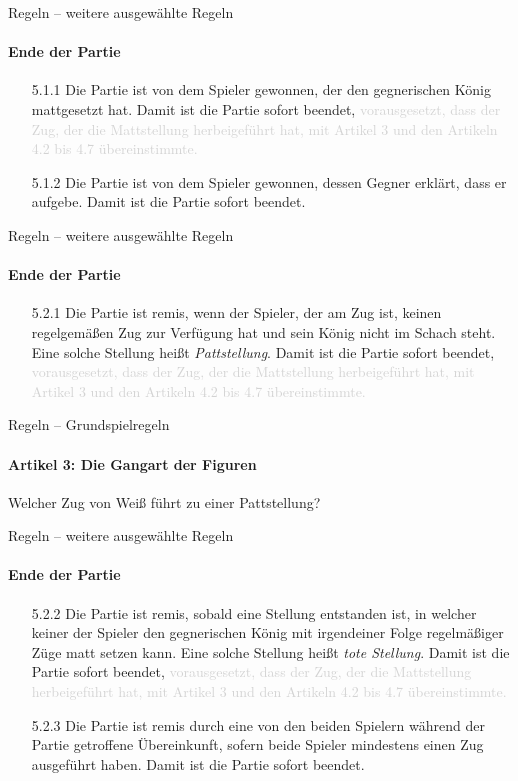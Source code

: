 \documentclass[
  aspectratio=1610,
]{beamer}
\begin{document}
\begin{frame}[<+->]{Regeln – weitere ausgewählte Regeln}
  \framesubtitle{Ende der Partie}
  \begin{itemize}
    \item[5.1.1] Die Partie ist von dem Spieler gewonnen, der den gegnerischen König
      mattgesetzt hat.
      Damit ist die Partie sofort beendet,
      \textcolor{lightgray}{
        vorausgesetzt, dass der Zug, der die Mattstellung herbeigeführt hat, mit Artikel 3
        und den Artikeln 4.2 bis 4.7 übereinstimmte.
    }
    \item[5.1.2] Die Partie ist von dem Spieler gewonnen, dessen Gegner erklärt, dass er
      aufgebe. Damit ist die Partie sofort beendet.
  \end{itemize}
\end{frame}

\begin{frame}[<+->]{Regeln – weitere ausgewählte Regeln}
  \framesubtitle{Ende der Partie}
  \begin{itemize}
    \item[5.2.1] Die Partie ist remis, wenn der Spieler, der am Zug ist, keinen
      regelgemäßen Zug zur Verfügung hat und sein König nicht im Schach steht. Eine solche
      Stellung heißt \emph{Pattstellung}.
      Damit ist die Partie sofort beendet,
        \textcolor{lightgray}{
        vorausgesetzt, dass der Zug, der die Mattstellung herbeigeführt hat, mit Artikel 3
        und den Artikeln 4.2 bis 4.7 übereinstimmte.
      }
  \end{itemize}
\end{frame}

\begin{frame}[<+->]{Regeln – Grundspielregeln}
  \framesubtitle{Artikel 3: Die Gangart der Figuren}
  \begin{center}
    \chessboard[
      setfen=k/2K/8/8/1Q/8/8/8 w - - 0 1, %
      moveid=1w,
    ]

    Welcher Zug von Weiß führt zu einer Pattstellung?
  \end{center}
\end{frame}

\begin{frame}[<+->]{Regeln – weitere ausgewählte Regeln}
  \framesubtitle{Ende der Partie}
  \begin{itemize}
    \item[5.2.2] Die Partie ist remis, sobald eine Stellung entstanden ist, in welcher
      keiner der Spieler den gegnerischen König mit irgendeiner Folge regelmäßiger Züge
      matt setzen kann. Eine solche Stellung heißt \emph{tote Stellung}.
      Damit ist die Partie sofort beendet,
      \textcolor{lightgray}{
        vorausgesetzt, dass der Zug, der die Mattstellung herbeigeführt hat, mit Artikel 3
        und den Artikeln 4.2 bis 4.7 übereinstimmte.
      }
    \item[5.2.3] Die Partie ist remis durch eine von den beiden Spielern während der
      Partie getroffene Übereinkunft, sofern beide Spieler mindestens einen Zug ausgeführt
      haben. Damit ist die Partie sofort beendet.
  \end{itemize}
\end{frame}
\end{document}
